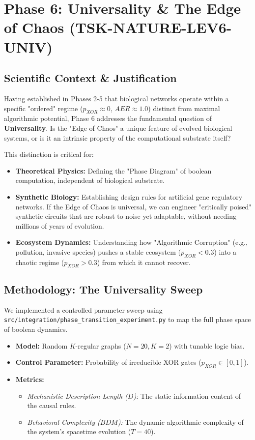 \documentclass[11pt]{article}
\begin{document}
\section{Phase 6: Universality \& The Edge of Chaos (TSK-NATURE-LEV6-UNIV)}

\subsection{Scientific Context \& Justification}
Having established in Phases 2-5 that biological networks operate within a specific "ordered" regime ($p_{XOR} \approx 0$, $AER \approx 1.0$) distinct from maximal algorithmic potential, Phase 6 addresses the fundamental question of \textbf{Universality}. Is the "Edge of Chaos" a unique feature of evolved biological systems, or is it an intrinsic property of the computational substrate itself?

This distinction is critical for:
\begin{itemize}
    \item \textbf{Theoretical Physics:} Defining the "Phase Diagram" of boolean computation, independent of biological substrate.
    \item \textbf{Synthetic Biology:} Establishing design rules for artificial gene regulatory networks. If the Edge of Chaos is universal, we can engineer "critically poised" synthetic circuits that are robust to noise yet adaptable, without needing millions of years of evolution.
    \item \textbf{Ecosystem Dynamics:} Understanding how "Algorithmic Corruption" (e.g., pollution, invasive species) pushes a stable ecosystem ($p_{XOR} < 0.3$) into a chaotic regime ($p_{XOR} > 0.3$) from which it cannot recover.
\end{itemize}

\subsection{Methodology: The Universality Sweep}
We implemented a controlled parameter sweep using \texttt{src/integration/phase\_transition\_experiment.py} to map the full phase space of boolean dynamics.
\begin{itemize}
    \item \textbf{Model:} Random $K$-regular graphs ($N=20, K=2$) with tunable logic bias.
    \item \textbf{Control Parameter:} Probability of irreducible XOR gates ($p_{XOR} \in [0, 1]$).
    \item \textbf{Metrics:}
    \begin{itemize}
        \item \textit{Mechanistic Description Length ($D$):} The static information content of the causal rules.
        \item \textit{Behavioral Complexity ($BDM$):} The dynamic algorithmic complexity of the system's spacetime evolution ($T=40$).
    \end{itemize}
\end{itemize}
\end{document}
